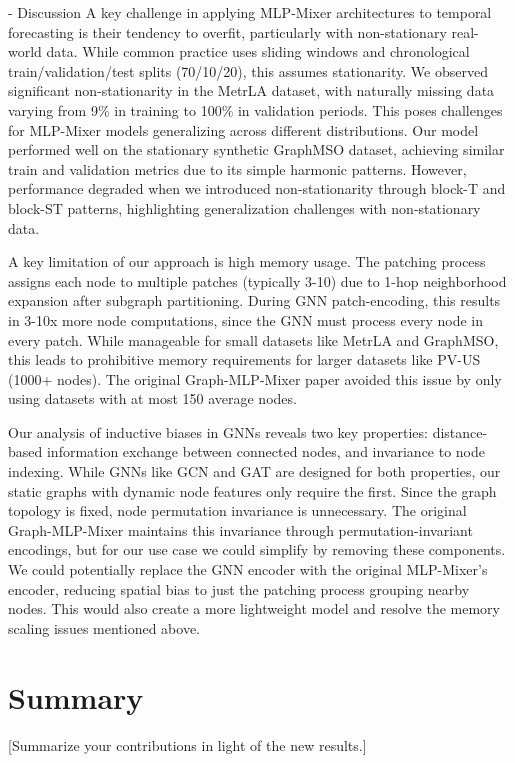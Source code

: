 \documentclass{article}
\theoremstyle{plain}
\theoremstyle{definition}
\theoremstyle{remark}
\begin{document}
- Discussion
A key challenge in applying MLP-Mixer architectures to temporal forecasting is their tendency to overfit, particularly with non-stationary real-world data. While common practice uses sliding windows and chronological train/validation/test splits (70/10/20), this assumes stationarity. We observed significant non-stationarity in the MetrLA dataset, with naturally missing data varying from 9\% in training to 100\% in validation periods. This poses challenges for MLP-Mixer models generalizing across different distributions. Our model performed well on the stationary synthetic GraphMSO dataset, achieving similar train and validation metrics due to its simple harmonic patterns. However, performance degraded when we introduced non-stationarity through block-T and block-ST patterns, highlighting generalization challenges with non-stationary data.

A key limitation of our approach is high memory usage. The patching process assigns each node to multiple patches (typically 3-10) due to 1-hop neighborhood expansion after subgraph partitioning. During GNN patch-encoding, this results in 3-10x more node computations, since the GNN must process every node in every patch. While manageable for small datasets like MetrLA and GraphMSO, this leads to prohibitive memory requirements for larger datasets like PV-US (1000+ nodes). The original Graph-MLP-Mixer paper avoided this issue by only using datasets with at most 150 average nodes.

Our analysis of inductive biases in GNNs reveals two key properties: distance-based information exchange between connected nodes, and invariance to node indexing. While GNNs like GCN and GAT are designed for both properties, our static graphs with dynamic node features only require the first. Since the graph topology is fixed, node permutation invariance is unnecessary. The original Graph-MLP-Mixer maintains this invariance through permutation-invariant encodings, but for our use case we could simplify by removing these components. We could potentially replace the GNN encoder with the original MLP-Mixer's encoder, reducing spatial bias to just the patching process grouping nearby nodes. This would also create a more lightweight model and resolve the memory scaling issues mentioned above.

\section{Summary}

[Summarize your contributions in light of the new results.]
\end{document}

